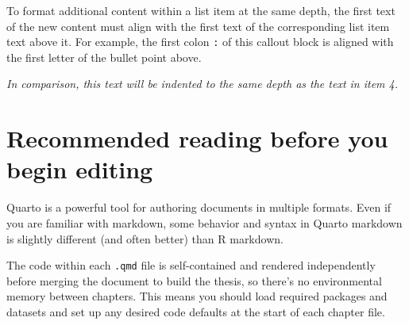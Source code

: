 \documentclass[
  11pt,
  letterpaper,
  twoside]{report}
\begin{document}
\begin{enumerate}
\begin{itemize}
    \begin{tcolorbox}[enhanced jigsaw, coltitle=black, leftrule=.75mm, titlerule=0mm, rightrule=.15mm, toprule=.15mm, opacityback=0, colbacktitle=quarto-callout-note-color!10!white, breakable, colback=white, left=2mm, opacitybacktitle=0.6, bottomtitle=1mm, bottomrule=.15mm, colframe=quarto-callout-note-color-frame, title=\textcolor{quarto-callout-note-color}{\faInfo}\hspace{0.5em}{Note}, arc=.35mm, toptitle=1mm]

    To format additional content within a list item at the same depth,
    the first text of the new content must align with the first text of
    the corresponding list item text above it. For example, the first
    colon \texttt{:} of this callout block is aligned with the first
    letter of the bullet point above.

    \end{tcolorbox}
  \end{itemize}

  \emph{In comparison, this text will be indented to the same depth as
  the text in item 4.}
\end{enumerate}

\section{Recommended reading before you begin
editing}\label{recommended-reading-before-you-begin-editing}

Quarto is a powerful tool for authoring documents in multiple formats.
Even if you are familiar with markdown, some behavior and syntax in
Quarto markdown is slightly different (and often better) than R
markdown.

\begin{tcolorbox}[enhanced jigsaw, coltitle=black, leftrule=.75mm, titlerule=0mm, rightrule=.15mm, toprule=.15mm, opacityback=0, colbacktitle=quarto-callout-caution-color!10!white, breakable, colback=white, left=2mm, opacitybacktitle=0.6, bottomtitle=1mm, bottomrule=.15mm, colframe=quarto-callout-caution-color-frame, title=\textcolor{quarto-callout-caution-color}{\faFire}\hspace{0.5em}{Caution}, arc=.35mm, toptitle=1mm]

The code within each \texttt{.qmd} file is self-contained and rendered
independently before merging the document to build the thesis, so
there's no environmental memory between chapters. This means you should
load required packages and datasets and set up any desired code defaults
at the start of each chapter file.

\end{tcolorbox}
\end{document}
